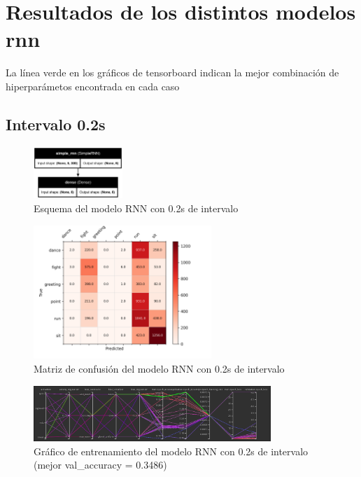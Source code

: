 \chapter{Resultados de los distintos modelos \gls{rnn}}
\label{appendix:resultadosRNN}

La línea verde en los gráficos de tensorboard indican la mejor combinación de hiperparámetos encontrada en cada caso

\section{Intervalo 0.2s}

\begin{figure}[H]
    \centering
    \includegraphics[width=0.3\textwidth]{Imagenes/Bitmap/best-rnn0.2.png}
    \caption{Esquema del modelo RNN con 0.2s de intervalo}
    \label{fig:rnn-0.2-final}
\end{figure}
\begin{figure}[H]
    \centering
    \includegraphics[width=0.6\textwidth]{Imagenes/Bitmap/CM_best-rnn0.2.png}
    \caption{Matriz de confusión del modelo RNN con 0.2s de intervalo}
    \label{fig:rnn-0.2-matriz}
\end{figure}
\begin{figure}[H]
    \centering
    \includegraphics[width=0.8\textwidth]{Imagenes/Bitmap/tb-rnn-0.2.png}
    \caption{Gráfico de entrenamiento del modelo RNN con 0.2s de intervalo (mejor val\_accuracy = 0.3486)}
    \label{fig:rnn-0.2-grafico}
\end{figure}

